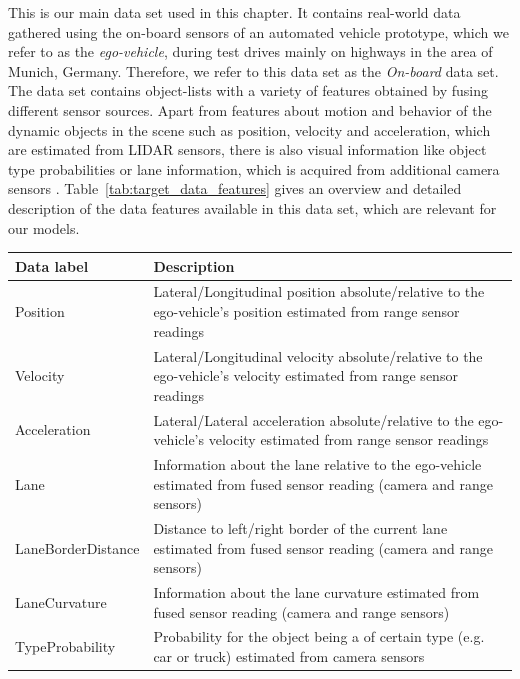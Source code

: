 This is our main data set used in this chapter.
It contains real-world data gathered using the on-board sensors of an automated vehicle prototype, which we refer to as the \emph{ego-vehicle}, during test drives mainly on highways in the area of Munich, Germany.
Therefore, we refer to this data set as the \emph{On-board} data set.
The data set contains object-lists with a variety of features obtained by fusing different sensor sources.
Apart from features about motion and behavior of the dynamic objects in the scene such as position, velocity and acceleration, which are estimated from \ac{LIDAR} sensors, there is also visual information like object type probabilities or lane information, which is acquired from additional camera sensors \parencite[see][for further information on the sensor setup]{Aeberhard2015}.
Table~\ref{tab:target_data_features} gives an overview and detailed description of the data features available in this data set, which are relevant for our models.
\begin{center}
	\begin{tabular}{|l | p{12cm}|}
		\hline
		\textbf{Data label} & \textbf{Description}\\ \hline
		Position & Lateral/Longitudinal position absolute/relative to the ego-vehicle's position estimated from range sensor readings \\ \hline
		Velocity& Lateral/Longitudinal velocity absolute/relative to the ego-vehicle's velocity estimated from range sensor readings \\ \hline
		Acceleration & Lateral/Lateral acceleration absolute/relative to the ego-vehicle's velocity estimated from range sensor readings \\ \hline
		Lane & Information about the lane relative to the ego-vehicle estimated from fused sensor reading (camera and range sensors) \\ \hline
		LaneBorderDistance & Distance to left/right border of the current lane estimated from fused sensor reading (camera and range sensors) \\ \hline
		LaneCurvature & Information about the lane curvature estimated from fused sensor reading (camera and range sensors) \\ \hline
		TypeProbability & Probability for the object being a of certain type (e.g. car or truck) estimated from camera sensors \\ \hline
	\end{tabular}
	\label{tab:target_data_features}
\end{center}
